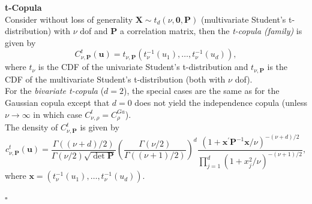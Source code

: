 \textbf{t-Copula}\\
Consider without loss of generality $\bm{X} \sim {t_{d}(\nu, \bm{0}, \mathbf{P})}$ (multivariate Student's t-distribution) with $\nu$ \ac{dof} and $\bm{P}$ a correlation matrix, then the \textit{t-copula (family)} is given by
\begin{equation}
C_{\nu, \bm{P}}^{t}(\mathbf{u})=t_{\nu, \bm{P}}\left(t_{\nu}^{-1}\left(u_{1}\right), \ldots, t_{\nu}^{-1}\left(u_{d}\right)\right),
\end{equation}
where $t_{\nu}$ is the \ac{CDF} of the univariate Student's t-distribution  and $t_{\nu, \bm{P}}$ is the \ac{CDF} of the multivariate Student's t-distribution (both with $\nu$ \ac{dof}).\\
For the \textit{bivariate t-copula} ($d=2$), the special cases are the same as for the Gaussian copula except that $d=0$ does not yield the independence copula (unless $\nu \rightarrow \infty$ in which case  $ C_{\nu, \rho}^{t} = C_{\rho}^{G a}$).\\
The density of $C_{\nu, \bm{P}}^{t}$ is given by
\begin{equation}
c_{\nu, \mathbf{P}}^{t}(\boldsymbol{u})=\frac{\Gamma((\nu+d) / 2)}{\Gamma(\nu / 2) \sqrt{\operatorname{det} \mathbf{P}}}\left(\frac{\Gamma(\nu / 2)}{\Gamma((\nu+1) / 2)}\right)^{d} \frac{\left(1+\boldsymbol{x}^{\prime} \mathbf{P}^{-1} \boldsymbol{x} / \nu\right)^{-(\nu+d) / 2}}{\prod_{j=1}^{d}\left(1+x_{j}^{2} / \nu\right)^{-(\nu+1) / 2}},
\end{equation}
where $\bm{x} = \left(t_{\nu}^{-1}\left(u_{1}\right), \ldots, t_{\nu}^{-1}\left(u_{d}\right)\right)$.

\hfill $\square$ \\






